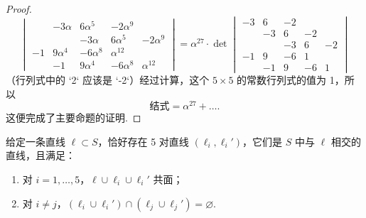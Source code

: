 \begin{proof}
\[\begin{vmatrix}
& -3\alpha & 6\alpha^5 & -2\alpha^9 & \\
& & -3\alpha & 6\alpha^5 & -2\alpha^9 \\
-1 & 9\alpha^4 & -6\alpha^8 & \alpha^{12} & \\
& -1 & 9\alpha^4 & -6\alpha^8 & \alpha^{12}
\end{vmatrix} = \alpha^{27} \cdot \det \begin{vmatrix}
-3 & 6 & -2 & & \\
& -3 & 6 & -2 & \\
& & -3 & 6 & -2 \\
-1 & 9 & -6 & 1 & \\
& -1 & 9 & -6 & 1
\end{vmatrix}
\]
（行列式中的 `2` 应该是 `-2`）经过计算，这个 \(5 \times 5\) 的常数行列式的值为 1，所以
\[
\text{结式} = \alpha^{27} + \dots.
\]
这便完成了主要命题的证明.
\end{proof}

\begin{proposition}
给定一条直线 \(\ell \subset S\)，恰好存在 5 对直线 \((\ell_i, \ell_i')\)，它们是 \(S\) 中与 \(\ell\) 相交的直线，且满足：
\begin{enumerate}
    \item[(i)] 对 \(i=1, \dots, 5\)，\(\ell \cup \ell_i \cup \ell_i'\) 共面；
    \item[(ii)] 对 \(i \neq j\)，\((\ell_i \cup \ell_i') \cap (\ell_j \cup \ell_j') = \varnothing\).
\end{enumerate}
\end{proposition}

